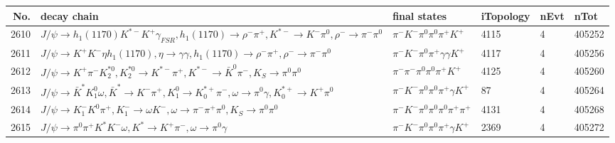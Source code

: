 \begin{table}[htbp] 
\begin{center}
\begin{small}
\begin{tabular}{rlllll}\hline\hline
 No. & decay chain & final states &  iTopology & nEvt & nTot \\\hline
2610&$J/\psi       \rightarrow h_{1}(1170)    K^{*-}         K^{+}          \gamma_{FSR} , h_{1}(1170)     \rightarrow \rho^{-}      \pi^{+}        , K^{*-}          \rightarrow K^{-}          \pi^{0}        , \rho^{-}       \rightarrow \pi^{-}        \pi^{0}        $&$\pi^{-}        K^{-}          \pi^{0}        \pi^{0}        \pi^{+}        K^{+}          $& 4115&    4&405252\\
2611&$J/\psi       \rightarrow K^{+}          K^{-}          \eta          h_{1}(1170)    , \eta           \rightarrow \gamma       \gamma       , h_{1}(1170)     \rightarrow \rho^{-}      \pi^{+}        , \rho^{-}       \rightarrow \pi^{-}        \pi^{0}        $&$\pi^{-}        K^{-}          \pi^{0}        \pi^{+}        \gamma       \gamma       K^{+}          $& 4117&    4&405256\\
2612&$J/\psi       \rightarrow K^{+}          \pi^{-}        K_2^{*0}       , K_2^{*0}        \rightarrow K^{*-}         \pi^{+}        , K^{*-}          \rightarrow \bar{K}^{0}   \pi^{-}        , K_{S}           \rightarrow \pi^{0}        \pi^{0}        $&$\pi^{-}        \pi^{-}        \pi^{0}        \pi^{0}        \pi^{+}        K^{+}          $& 4125&    4&405260\\
2613&$J/\psi       \rightarrow \bar{K}^{*}   K_1^{0}        \omega         , \bar{K}^{*}    \rightarrow K^{-}          \pi^{+}        , K_1^{0}         \rightarrow K_{0}^{*+}     \pi^{-}        , \omega          \rightarrow \pi^{0}        \gamma       , K_{0}^{*+}      \rightarrow K^{+}          \pi^{0}        $&$\pi^{-}        K^{-}          \pi^{0}        \pi^{0}        \pi^{+}        \gamma       K^{+}          $&   87&    4&405264\\
2614&$J/\psi       \rightarrow K_{1}^{-}      K^{0}          \pi^{+}        , K_{1}^{-}       \rightarrow \omega         K^{-}          , \omega          \rightarrow \pi^{-}        \pi^{+}        \pi^{0}        , K_{S}           \rightarrow \pi^{0}        \pi^{0}        $&$\pi^{-}        K^{-}          \pi^{0}        \pi^{0}        \pi^{0}        \pi^{+}        \pi^{+}        $& 4131&    4&405268\\
2615&$J/\psi       \rightarrow \pi^{0}        \pi^{+}        K^{*}          K^{-}          \omega         , K^{*}           \rightarrow K^{+}          \pi^{-}        , \omega          \rightarrow \pi^{0}        \gamma       $&$\pi^{-}        K^{-}          \pi^{0}        \pi^{0}        \pi^{+}        \gamma       K^{+}          $& 2369&    4&405272\\

\end{tabular}
\end{small}
\end{center}
\end{table}

